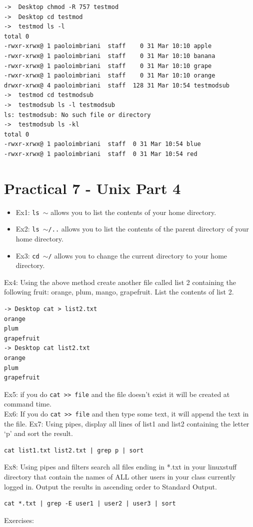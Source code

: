 \documentclass[a4paper]{article}
\begin{document}
\begin{verbatim}
->  Desktop chmod -R 757 testmod
->  Desktop cd testmod
->  testmod ls -l
total 0
-rwxr-xrwx@ 1 paoloimbriani  staff    0 31 Mar 10:10 apple
-rwxr-xrwx@ 1 paoloimbriani  staff    0 31 Mar 10:10 banana
-rwxr-xrwx@ 1 paoloimbriani  staff    0 31 Mar 10:10 grape
-rwxr-xrwx@ 1 paoloimbriani  staff    0 31 Mar 10:10 orange
drwxr-xrwx@ 4 paoloimbriani  staff  128 31 Mar 10:54 testmodsub
->  testmod cd testmodsub 
->  testmodsub ls -l testmodsub
ls: testmodsub: No such file or directory
->  testmodsub ls -kl
total 0
-rwxr-xrwx@ 1 paoloimbriani  staff  0 31 Mar 10:54 blue
-rwxr-xrwx@ 1 paoloimbriani  staff  0 31 Mar 10:54 red
\end{verbatim}

\section{Practical 7 - Unix Part 4}

\begin{itemize}
    \item Ex1: \texttt{ls $\sim$} allows you to list the contents of your home directory.
    \item Ex2: \texttt{ls $\sim$/..} allows you to list the contents of the parent directory of your home directory.
    \item Ex3: \texttt{cd $\sim$/} allows you to change the current directory to your home directory.
\end{itemize}
\textcolor{green!50!black}{
    Ex4: Using the above method create another file called list 2 containing the following fruit:
orange, plum, mango, grapefruit. List the contents of list 2.
}
\begin{verbatim}
-> Desktop cat > list2.txt
orange
plum
grapefruit
-> Desktop cat list2.txt
orange
plum
grapefruit
\end{verbatim}
\noindent
Ex5: if you do \texttt{cat >> file} and the file doesn't exist it will be created at command time.\\
Ex6: If you do \texttt{cat >> file} and then type some text, it will append the text in the file.
Ex7:
Using pipes, display all lines of list1 and list2 containing the letter ‘p’ and sort the
result.
\begin{verbatim}
cat list1.txt list2.txt | grep p | sort
\end{verbatim}
\noindent
Ex8: 
Using pipes and filters search all files ending in *.txt in your linuxstuff directory that
contain the names of ALL other users in your class currently logged in. Output the
results in ascending order to Standard Output.
\begin{verbatim}
cat *.txt | grep -E user1 | user2 | user3 | sort
\end{verbatim}
\noindent
Exercises:
\end{document}
